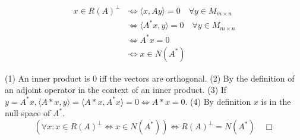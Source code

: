 \documentclass[12pt,letterpaper,reqno]{amsart}
\begin{document}
\begin{enumerate}[1.]
\begin{align}
    x \in R(A)^\perp &\Leftrightarrow \langle x, Ay \rangle = 0 \quad \forall y \in M_{m\times n} \label{eq:4}\\
    &\Leftrightarrow \langle A^*x, y \rangle = 0 \quad \forall y \in M_{m\times n}\label{eq:3}\\
    &\Leftrightarrow A^*x = 0\\
    &\Leftrightarrow x \in N(A^*)
\end{align}
\begin{flushleft}
(1) An inner product is 0 iff the vectors are orthogonal. \newline
(2) By the definition of an adjoint operator in the context of an inner product. \newline
(3) If $y = A^*x, \langle A*x, y \rangle = \langle A*x, A^*x \rangle = 0 \Leftrightarrow A*x = 0$. \newline
(4) By definition $x$ is in the null space of $A^*$.
$$ (\forall x: x \in R(A)^\perp \Leftrightarrow x \in N(A^*)) \Leftrightarrow R(A)^\perp = N(A^*) \quad \Box $$
\end{flushleft}
\end{enumerate}
\end{document}
